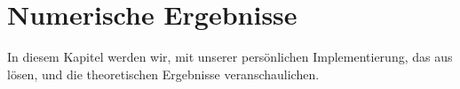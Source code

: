 \section{Numerische Ergebnisse}

In diesem Kapitel werden wir, mit unserer persönlichen Implementierung, das  aus \cite{saad2020rational} lösen, und die theoretischen Ergebnisse veranschaulichen.
